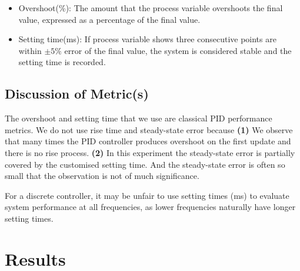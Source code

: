 \documentclass[conference]{IEEEtran}
\begin{document}
\begin{itemize}
        \begin{itemize}
            \item Overshoot(\%): The amount that the process variable overshoots the final value, expressed as a percentage of the final value.
            \item Setting time(ms): If process variable shows three consecutive points are within $\pm5\%$ error of the final value, the system is considered stable and the setting time is recorded.
        \end{itemize}
\end{itemize}

\subsection{Discussion of Metric(s)}

The overshoot and setting time that we use are classical PID performance metrics. We do not use rise time and steady-state error because \textbf{(1)} We observe that many times the PID controller produces overshoot on the first update and there is no rise process. \textbf{(2)} In this experiment the steady-state error is partially covered by the customised setting time. And the steady-state error is often so small that the observation is not of much significance.

For a discrete controller, it may be unfair to use setting times (ms) to evaluate system performance at all frequencies, as lower frequencies naturally have longer setting times. 



\section{Results}
\end{document}
